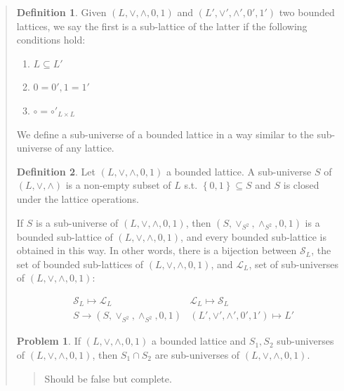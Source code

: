 \documentclass[a4paper, 12pt]{article}
\theoremstyle{definition}
\newtheorem{problem}{Problem}
\theoremstyle{definition}
\theoremstyle{definition}
\newtheorem{definition}{Definition}
\begin{document}
\begin{quote}
\begin{definition}
    Given $(L, \lor, \land, 0, 1)$ and $(L', \lor', \land', 0', 1')$ two bounded
    lattices, we say the first is a sub-lattice of the latter if the following
    conditions hold: 

    \begin{enumerate}
        \item $L \subseteq L'$
        \item $0=0', 1 = 1'$
        \item $\circ  = \circ'_{L\times L}$
    \end{enumerate}
\end{definition}

We define a sub-universe of a bounded lattice in a way similar to the 
sub-universe of any lattice. 

\begin{definition}
    Let $(L, \lor, \land, 0, 1)$ a bounded lattice. A sub-universe $S$ of $(L,
    \lor, \land)$ is a non-empty subset of $L$ s.t. $\left\{ 0, 1 \right\}
    \subseteq S $ and $S$ is closed under the lattice operations.
\end{definition}

If $S$ is a sub-universe of $(L, \lor, \land, 0, 1)$, then $(S, \lor_{S^2},
\land_{S^2}, 0, 1)$ is a bounded sub-lattice of $(L, \lor, \land, 0, 1)$, and
every bounded sub-lattice is obtained in this way. In other words, there is a
bijection between $\mathcal{S}_L$, the set of bounded sub-lattices of $(L,
\lor, \land, 0, 1)$, and $\mathcal{L}_L$, set of sub-universes of $(L, \lor,
\land, 0, 1)$:

\begin{align*}
    &\mathcal{S}_L \mapsto \mathcal{L}_{L} &\mathcal{L}_{L} \mapsto \mathcal{S}_{L}\\ 
    &S \to \left( S, \lor_{S^2}, \land_{S^2}, 0, 1 \right) &\left( L', \lor', \land', 0', 1' \right) \mapsto L'
\end{align*}

\begin{problem}
    If $(L, \lor, \land, 0, 1)$ a bounded lattice and $S_1, S_2$ sub-universes 
    of $(L, \lor, \land, 0, 1)$, then $S_1 \cap S_2$ are sub-universes 
    of $(L, \lor, \land, 0, 1)$.
\end{problem}


\small
\begin{quote}

    Should be false but complete.

\end{quote}
\normalsize


\end{quote}
\end{document}

